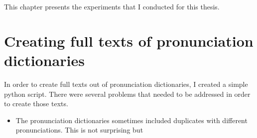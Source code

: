 
\label{chap:4_exp}
This chapter presents the experiments that I conducted for this thesis. 


\section{Creating full texts of pronunciation dictionaries}
In order to create full texts out of pronunciation dictionaries, I created a simple python script. There were several problems that needed to be addressed in order to create those texts. 

\begin{itemize}
\item The pronunciation dictionaries sometimes included duplicates with different pronunciations. This is not surprising but 
\end{itemize}
